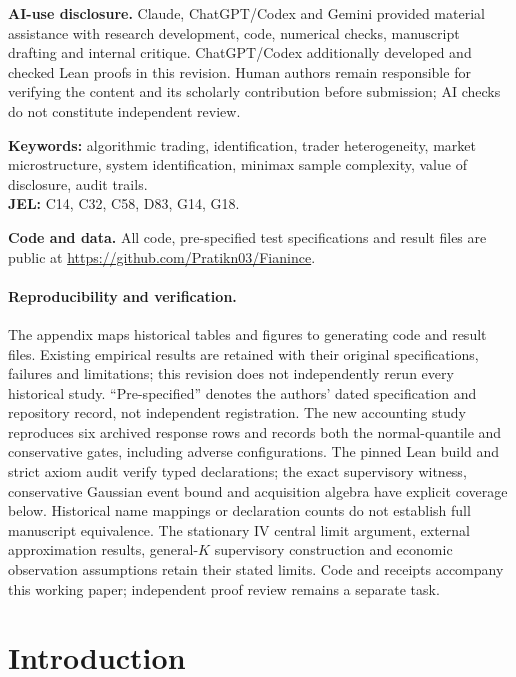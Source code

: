 \documentclass[12pt]{article}
\theoremstyle{definition}
\theoremstyle{remark}
\begin{document}
\noindent\textbf{AI-use disclosure.} Claude, ChatGPT/Codex and Gemini provided material assistance with research development, code, numerical checks, manuscript drafting and internal critique. ChatGPT/Codex additionally developed and checked Lean proofs in this revision. Human authors remain responsible for verifying the content and its scholarly contribution before submission; AI checks do not constitute independent review.




\noindent\textbf{Keywords:} algorithmic trading, identification, trader heterogeneity, market microstructure, system identification, minimax sample complexity, value of disclosure, audit trails.\\
\textbf{JEL:} C14, C32, C58, D83, G14, G18.



\noindent\textbf{Code and data.} All code, pre-specified test specifications and result files are public at \url{https://github.com/Pratikn03/Fianince}.

\paragraph{Reproducibility and verification.} The appendix maps historical tables and figures to generating code and result files. Existing empirical results are retained with their original specifications, failures and limitations; this revision does not independently rerun every historical study. ``Pre-specified'' denotes the authors' dated specification and repository record, not independent registration. The new accounting study reproduces six archived response rows and records both the normal-quantile and conservative gates, including adverse configurations. The pinned Lean build and strict axiom audit verify typed declarations; the exact supervisory witness, conservative Gaussian event bound and acquisition algebra have explicit coverage below. Historical name mappings or declaration counts do not establish full manuscript equivalence. The stationary IV central limit argument, external approximation results, general-$K$ supervisory construction and economic observation assumptions retain their stated limits. Code and receipts accompany this working paper; independent proof review remains a separate task.

\endgroup
\newpage
\setcounter{page}{1}

\section{Introduction}
\end{document}
